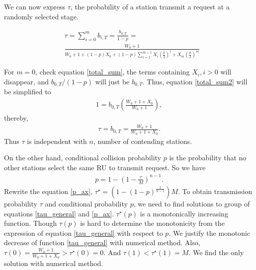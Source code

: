 We can now express $\tau$, the probability of a station transmit a request at a randomly selected stage.

\begin{align}
\label{tau_general}
&\tau = \sum_{i=0}^m b_{i,T} = \frac{b_{0,T}}{1-p} = \nonumber \\
&\frac{W_0+1}{W_0+1+(1-p)X_0+(1-p) \sum_{i=1}^{m-1}X_i\left( \frac{p}{2}\right)^i+X_m\left( \frac{p}{2}\right)^m}
\end{align}

For $m=0$, check equation \ref{total_sum}, the terms containing $X_i, i>0$ will disappear, and $b_{0,T}/(1-p)$ will just be $b_{0,T}$.
Thus, equation \ref{total_sum2} will be simplified to 
\begin{align}
1 = b_{0,T}\left( \frac{W_0+1+X_0}{W_0+1}\right),
\end{align}
thereby, 
\begin{align}
\tau = b_{0,T} = \frac{W_0+1}{W_0+1+X_0}.
\label{tau_W0}
\end{align}
Thus $\tau$ is independent with $n$, number of contending stations.

On the other hand, conditional collision probability $p$ is the probability that no other stations select the same RU to transmit request. So we have 
\begin{align}
\label{p_ax}
p = 1-\left( 1-\frac{\tau}{M} \right)^{n-1}.
\end{align}
Rewrite the equation \ref{p_ax}, $\tau^\star = \left(1-(1-p)^\frac{1}{n-1} \right)M$. 
To obtain transmission probability $\tau$ and conditional probability $p$, we need to find solutions to group of equations \ref{tau_general} and \ref{p_ax}.
$\tau^\star(p)$ is a monotonically increasing function. 
Though $\tau(p)$ is hard to determine the monotonicity from the expression of equation \ref{tau_general} with respect to $p$. 
We justify the monotonic decrease of function \ref{tau_general} with numerical method. 
Also, $\tau(0) = \frac{W_0+1}{W_0+1+X_0}> \tau^\star(0) = 0$.
And $\tau(1) < \tau^\star(1) = M$. We find the only solution with numerical method.



